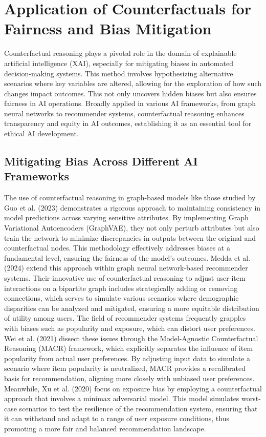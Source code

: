 \section{Application of Counterfactuals for Fairness and Bias Mitigation}

Counterfactual reasoning plays a pivotal role in the domain of explainable artificial intelligence (XAI), especially for mitigating biases in automated decision-making systems. This method involves hypothesizing alternative scenarios where key variables are altered, allowing for the exploration of how such changes impact outcomes. This not only uncovers hidden biases but also ensures fairness in AI operations. Broadly applied in various AI frameworks, from graph neural networks to recommender systems, counterfactual reasoning enhances transparency and equity in AI outcomes, establishing it as an essential tool for ethical AI development.


\subsection{Mitigating Bias Across Different AI Frameworks}

The use of counterfactual reasoning in graph-based models like those studied by Guo et al. (2023) demonstrates a rigorous approach to maintaining consistency in model predictions across varying sensitive attributes. By implementing Graph Variational Autoencoders (GraphVAE), they not only perturb attributes but also train the network to minimize discrepancies in outputs between the original and counterfactual nodes. This methodology effectively addresses biases at a fundamental level, ensuring the fairness of the model's outcomes. Medda et al. (2024) extend this approach within graph neural network-based recommender systems. Their innovative use of counterfactual reasoning to adjust user-item interactions on a bipartite graph includes strategically adding or removing connections, which serves to simulate various scenarios where demographic disparities can be analyzed and mitigated, ensuring a more equitable distribution of utility among users.
The field of recommender systems frequently grapples with biases such as popularity and exposure, which can distort user preferences. Wei et al. (2021) dissect these issues through the Model-Agnostic Counterfactual Reasoning (MACR) framework, which explicitly separates the influence of item popularity from actual user preferences. By adjusting input data to simulate a scenario where item popularity is neutralized, MACR provides a recalibrated basis for recommendation, aligning more closely with unbiased user preferences. Meanwhile, Xu et al. (2020) focus on exposure bias by employing a counterfactual approach that involves a minimax adversarial model. This model simulates worst-case scenarios to test the resilience of the recommendation system, ensuring that it can withstand and adapt to a range of user exposure conditions, thus promoting a more fair and balanced recommendation landscape.

